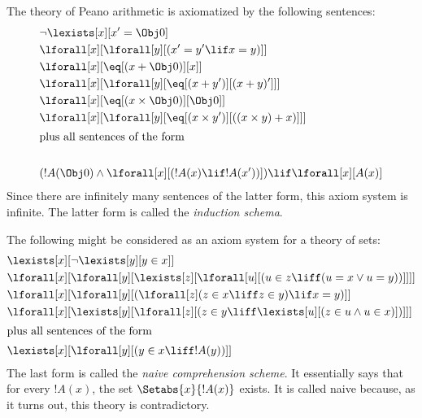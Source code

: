 \documentclass[../../include/open-logic-section]{subfiles}
\begin{document}
\begin{ex}
The theory of Peano arithmetic is axiomatized by the following sentences:
\begin{align*}
& \lnot\lexists[x][x' = \Obj 0]\\
& \lforall[x][\lforall[y][(x' = y' \lif x = y)]]\\
& \lforall[x][\eq[(x + \Obj 0)][x]]\\
& \lforall[x][\lforall[y][\eq[(x + y')][(x + y)']]]\\
& \lforall[x][\eq[(x \times \Obj 0)][\Obj 0]]\\
& \lforall[x][\lforall[y][\eq[(x \times y')][((x \times y) + x)]]]\\
\intertext{plus all sentences of the form}\\
& (!A(\Obj 0) \land \lforall[x][(!A(x) \lif !A(x'))]) \lif \lforall[x][A(x)]
\end{align*}
Since there are infinitely many sentences of the latter form, this
axiom system is infinite.  The latter form is called the
\emph{induction schema}.
\end{ex}

\begin{ex}
The following might be considered as an axiom system for a theory of sets:
\begin{align*}
& \lexists[x][\lnot \lexists[y][y \in x]]\\
& \lforall[x][\lforall[y][\lexists[z][\lforall[u][(u \in z \liff (u = x \lor u = y))]]]]\\
& \lforall[x][\lforall[y][(\lforall[z](z \in x \liff z \in y) \lif x = y)]]\\
& \lforall[x][\lexists[y][\lforall[z][(z \in y \liff \lexists[u][(z \in u \land u \in x)])]]]\\
\intertext{plus all sentences of the form}
& \lexists[x][\lforall[y][(y \in x \liff !A(y))]]
\end{align*}
The last form is called the \emph{naive comprehension scheme}.  It
essentially says that for every $!A(x)$, the set $\Setabs{x}{!A(x)}$
exists. It is called naive because, as it turns out, this theory is
contradictory.
\end{ex}
\end{document}
